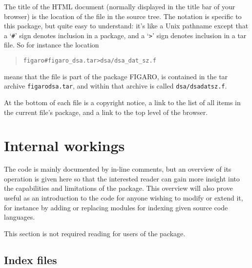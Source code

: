 \documentclass[twoside,11pt]{article}
\newcommand{\xlabel}[1]{}
\renewcommand{\_}{\texttt{\symbol{95}}}
\begin{document}
The title of the HTML document
(normally displayed in the title bar of your browser)
is the location of the file in 
the source tree.  The notation is specific to this package,
but quite easy to understand: 
it's like a Unix pathname except that
a `{\tt \#}' sign denotes inclusion in a package, 
and a 
`\verb|>|'
sign denotes inclusion in a tar file.
So for instance the location
\begin{quote}
\begin{verbatim}
figaro#figaro_dsa.tar>dsa/dsa_dat_sz.f
\end{verbatim}
\end{quote}
means that the file is part of the package FIGARO,
is contained in the tar archive {\tt figaro\_dsa.tar}, and
within that archive is called {\tt dsa/dsa\_dat\_sz.f}.

At the bottom of each file is a copyright notice, 
a link to the list of all items in the current file's package,
and a link to the top level of the browser.


\section{\xlabel{sec:internals}\label{sec:internals}Internal workings}

The code is mainly documented by in-line comments,
but an overview of its operation is given here so 
that the interested reader can gain more insight into
the capabilities and limitations of the package.
This overview will also prove useful as an introduction to
the code for anyone wishing to modify or extend it, 
for instance by adding or replacing modules for indexing 
given source code languages.

This section is not required reading for users of the package.

\subsection{\xlabel{sec:internals-indexes}\label{sec:internals-indexes}Index files}
\end{document}

